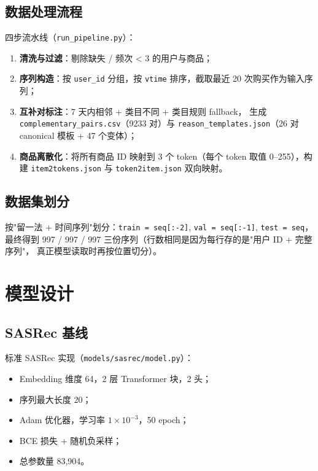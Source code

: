 \documentclass[12pt,a4paper]{article}
\begin{document}
\subsection{数据处理流程}
四步流水线（\texttt{run\_pipeline.py}）：
\begin{enumerate}[leftmargin=2em]
    \item \textbf{清洗与过滤}：剔除缺失 / 频次 < 3 的用户与商品；
    \item \textbf{序列构造}：按 \texttt{user\_id} 分组，按 \texttt{vtime}
          排序，截取最近 20 次购买作为输入序列；
    \item \textbf{互补对标注}：7 天内相邻 + 类目不同 + 类目规则 fallback，
          生成 \texttt{complementary\_pairs.csv}（9233 对）与
          \texttt{reason\_templates.json}（26 对 canonical 模板 + 47 个变体）；
    \item \textbf{商品离散化}：将所有商品 ID 映射到 3 个 token（每个
          token 取值 0--255），构建 \texttt{item2tokens.json} 与
          \texttt{token2item.json} 双向映射。
\end{enumerate}

\subsection{数据集划分}
按"留一法 + 时间序列"划分：\texttt{train = seq[:-2]},
\texttt{val = seq[:-1]}, \texttt{test = seq}，最终得到
997 / 997 / 997 三份序列（行数相同是因为每行存的是"用户 ID + 完整序列"，
真正模型读取时再按位置切分）。

\section{模型设计}

\subsection{SASRec 基线}
标准 SASRec 实现（\texttt{models/sasrec/model.py}）：
\begin{itemize}[leftmargin=2em]
    \item Embedding 维度 64，2 层 Transformer 块，2 头；
    \item 序列最大长度 20；
    \item Adam 优化器，学习率 $1\times 10^{-3}$，50 epoch；
    \item BCE 损失 + 随机负采样；
    \item 总参数量 83,904。
\end{itemize}
\end{document}
